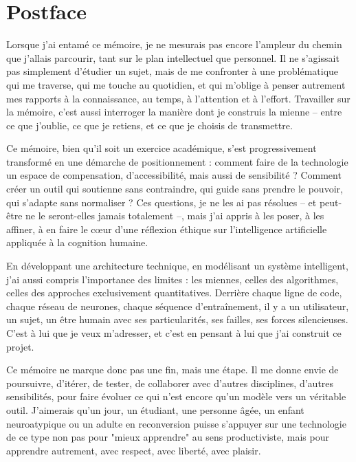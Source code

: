 \documentclass[11pt,a4paper]{report}
\begin{document}
\chapter*{Postface}

Lorsque j’ai entamé ce mémoire, je ne mesurais pas encore l’ampleur du chemin que j’allais parcourir, tant sur le plan intellectuel que personnel. Il ne s’agissait pas simplement d’étudier un sujet, mais de me confronter à une problématique qui me traverse, qui me touche au quotidien, et qui m’oblige à penser autrement mes rapports à la connaissance, au temps, à l’attention et à l’effort. Travailler sur la mémoire, c’est aussi interroger la manière dont je construis la mienne – entre ce que j’oublie, ce que je retiens, et ce que je choisis de transmettre.

Ce mémoire, bien qu’il soit un exercice académique, s’est progressivement transformé en une démarche de positionnement : comment faire de la technologie un espace de compensation, d’accessibilité, mais aussi de sensibilité ? Comment créer un outil qui soutienne sans contraindre, qui guide sans prendre le pouvoir, qui s’adapte sans normaliser ? Ces questions, je ne les ai pas résolues – et peut-être ne le seront-elles jamais totalement –, mais j’ai appris à les poser, à les affiner, à en faire le cœur d’une réflexion éthique sur l’intelligence artificielle appliquée à la cognition humaine.

En développant une architecture technique, en modélisant un système intelligent, j’ai aussi compris l’importance des limites : les miennes, celles des algorithmes, celles des approches exclusivement quantitatives. Derrière chaque ligne de code, chaque réseau de neurones, chaque séquence d’entraînement, il y a un utilisateur, un sujet, un être humain avec ses particularités, ses failles, ses forces silencieuses. C’est à lui que je veux m’adresser, et c’est en pensant à lui que j’ai construit ce projet.

Ce mémoire ne marque donc pas une fin, mais une étape. Il me donne envie de poursuivre, d’itérer, de tester, de collaborer avec d’autres disciplines, d’autres sensibilités, pour faire évoluer ce qui n’est encore qu’un modèle vers un véritable outil. J’aimerais qu’un jour, un étudiant, une personne âgée, un enfant neuroatypique ou un adulte en reconversion puisse s’appuyer sur une technologie de ce type non pas pour "mieux apprendre" au sens productiviste, mais pour apprendre autrement, avec respect, avec liberté, avec plaisir.
\end{document}
